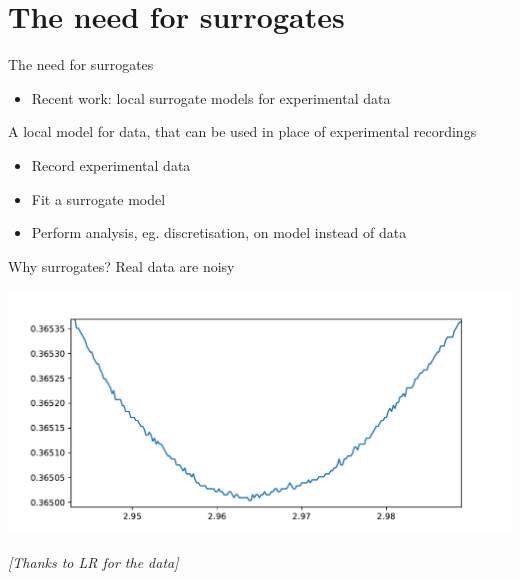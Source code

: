 \documentclass[presentation]{beamer}
\begin{document}
\section{The need for surrogates}
\label{sec:org5d1755d}
\begin{frame}[<+->][label={sec:orgc59d2a6}]{The need for surrogates}
\begin{itemize}
\item Recent work: local surrogate models for experimental data
\end{itemize}

\vfill

\begin{definition}
A local model for data, that can be used in place of experimental recordings
\end{definition}

\vfill

\begin{itemize}
\item Record experimental data
\item Fit a surrogate model
\item Perform analysis, eg. discretisation, on model instead of data
\end{itemize}
\end{frame}

\begin{frame}[label={sec:org23fc629}]{Why surrogates?}
Real data are noisy
\begin{center}
\includegraphics[width=.9\linewidth]{./noisy.pdf}
\end{center}

\begin{center}
\emph{[Thanks to LR for the data]}
\end{center}
\end{frame}
\end{document}

